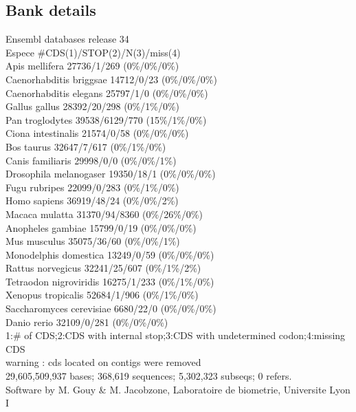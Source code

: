 \documentclass{article}
\begin{document}
\begin{Schunk}
\subsection{Bank details}
Ensembl databases release 34\\
Espece                                   \#CDS(1)/STOP(2)/N(3)/miss(4)\\
Apis mellifera                          27736/1/269 (0\%/0\%/0\%)\\
Caenorhabditis briggsae                 14712/0/23 (0\%/0\%/0\%)\\
Caenorhabditis elegans                  25797/1/0 (0\%/0\%/0\%)\\
Gallus gallus                           28392/20/298 (0\%/1\%/0\%)\\
Pan troglodytes                         39538/6129/770 (15\%/1\%/0\%)\\
Ciona intestinalis                      21574/0/58 (0\%/0\%/0\%)\\
Bos taurus                              32647/7/617 (0\%/1\%/0\%)\\
Canis familiaris                        29998/0/0 (0\%/0\%/1\%)\\
Drosophila melanogaser                  19350/18/1 (0\%/0\%/0\%)\\
Fugu rubripes                           22099/0/283 (0\%/1\%/0\%)\\
Homo sapiens                            36919/48/24 (0\%/0\%/2\%)\\
Macaca mulatta                          31370/94/8360 (0\%/26\%/0\%)\\
Anopheles gambiae                       15799/0/19 (0\%/0\%/0\%)\\
Mus musculus                            35075/36/60 (0\%/0\%/1\%)\\
Monodelphis domestica                   13249/0/59 (0\%/0\%/0\%)\\
Rattus norvegicus                       32241/25/607 (0\%/1\%/2\%)\\
Tetraodon nigroviridis                  16275/1/233 (0\%/1\%/0\%)\\
Xenopus tropicalis                      52684/1/906 (0\%/1\%/0\%)\\
Saccharomyces cerevisiae                6680/22/0 (0\%/0\%/0\%)\\
Danio rerio                             32109/0/281 (0\%/0\%/0\%)\\
1:\# of CDS;2:CDS with internal stop;3:CDS with undetermined codon;4:missing CDS\\
warning : cds located on contigs were removed\\
29,605,509,937 bases; 368,619 sequences; 5,302,323 subseqs; 0 refers.\\
Software by M. Gouy \& M. Jacobzone, Laboratoire de biometrie, Universite Lyon I


\end{Schunk}
\end{document}
